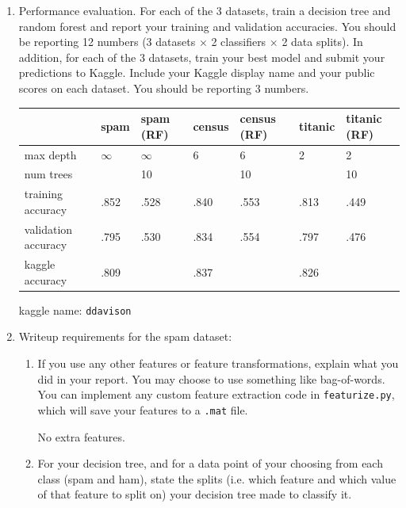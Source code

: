 \documentclass{article}
\begin{document}
\begin{enumerate}
\newpage
  \item Performance evaluation. For each of the 3 datasets, train a decision
    tree and random forest and report your training and validation
    accuracies. You should be reporting 12 numbers (3 datasets $\times$ 2
    classifiers $\times$ 2 data splits). In addition, for each of the 3
    datasets, train your best model and submit your predictions to
    Kaggle. Include your Kaggle display name and your public scores on each
    dataset. You should be reporting 3 numbers.
    \begin{mdframed}
      \begin{tabular}{l|l|l|l|l|l|l}
                              & spam     & spam (RF) & census & census (RF) & titanic & titanic (RF) \\
        \hline
        max depth             & $\infty$ & $\infty$  & 6      & 6           & 2       & 2           \\
        num trees             &          & 10        &        & 10          &         & 10          \\
        training accuracy     & .852     & .528      & .840   & .553        & .813    & .449        \\
        validation accuracy   & .795     & .530      & .834   & .554        & .797    & .476        \\
        kaggle accuracy       & .809     &           & .837   &             & .826    &             \\
      \end{tabular}

      kaggle name: \texttt{ddavison}

    \end{mdframed}

\newpage
    \item Writeup requirements for the spam dataset:
    \begin{enumerate}
        \item If you use any other features or feature transformations, explain what you did in your report. You may choose to use something like bag-of-words. You can implement any custom feature extraction code in \texttt{featurize.py}, which will save your features to a \texttt{.mat} file.
        \begin{mdframed}
          No extra features.
        \end{mdframed}

      \item For your decision tree, and for a data point of your choosing from
        each class (spam and ham), state the splits (i.e. which feature and
        which value of that feature to split on) your decision tree made to
        classify it.



\end{enumerate}
\end{enumerate}
\end{document}
